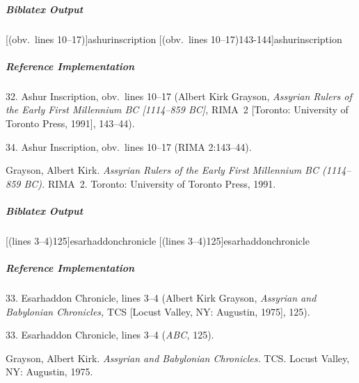 \documentclass[a4paper]{article}
\newenvironment{biboutput}{%
  \subparagraph{Biblatex Output}
}{\color{black}}
\newenvironment{refimp}{%
  \subparagraph{Reference Implementation}
  \color{reference-colour}
  \rm
}{\par\color{black}}
\begin{document}
\begin{biboutput}
  [(obv.\ lines 10--17)]{ashurinscription}
  [(obv.\ lines 10--17)143-144]{ashurinscription}
\end{biboutput}

\begin{refimp}
  \hspace*{\bibindent}32. Ashur Inscription, obv.\ lines 10–17 (Albert Kirk
  Grayson, \emph{Assyrian Rulers of the Early First Millennium BC [1114–859
  BC],} RIMA~2 [Toronto: University of Toronto Press, 1991], 143–44).

  \hspace*{\bibindent}34. Ashur Inscription, obv.\ lines 10–17 (RIMA
  2:143–44).

  \hangindent\bibindent Grayson, Albert Kirk. \emph{Assyrian Rulers of the
  Early First Millennium BC (1114–859 BC).} RIMA~2. Toronto: University of
  Toronto Press, 1991.

\end{refimp}

\begin{biboutput}
  [(lines 3--4)125]{esarhaddonchronicle}
  [(lines 3--4)125]{esarhaddonchronicle}
\end{biboutput}

\begin{refimp}
  \hspace*{\bibindent}33. Esarhaddon Chronicle, lines 3–4 (Albert Kirk
  Grayson, \emph{Assyrian and Babylonian Chronicles,} TCS [Locust Valley, NY:
  Augustin, 1975], 125).

  \hspace*{\bibindent}33. Esarhaddon Chronicle, lines 3–4 (\emph{ABC,} 125).

  \hangindent\bibindent Grayson, Albert Kirk. \emph{Assyrian and Babylonian
  Chronicles.} TCS. Locust Valley, NY: Augustin, 1975.


\end{refimp}
\end{document}
